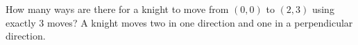 How many ways are there for a knight to move from $(0,0)$ to $(2,3)$ using exactly $3$ moves? A knight moves two in one direction and one in a perpendicular direction.
